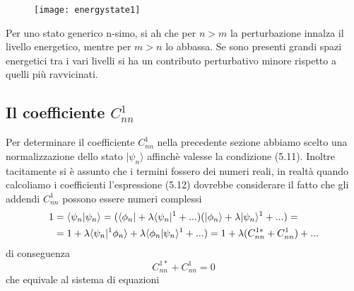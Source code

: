 \begin{wrapfigure}{l}{0.4\textwidth} %
    \centering
    \texttt{[image: energystate1]} %
    \label{fig:example}
\end{wrapfigure}
Per uno stato generico n-simo, si ah che per $n > m$ la perturbazione innalza il livello energetico, mentre per $m > n$ lo abbassa. Se sono presenti grandi spazi energetici tra i vari livelli si ha un contributo perturbativo minore rispetto a quelli pi\`u ravvicinati.

\subsection{Il coefficiente $C_{nn}^1$}

Per determinare il coefficiente $C^{1}_{nn}$ nella precedente sezione abbiamo scelto una normalizzazione dello stato $|\psi_n \rangle$ affinch\`e valesse la condizione (5.11). Inoltre tacitamente si \`e assunto che i termini fossero dei numeri reali, in realt\`a quando calcoliamo i coefficienti l'espressione (5.12) dovrebbe considerare il fatto che gli addendi $C_{nn}^{1}$ possono essere numeri complessi
\begin{align}
	1 & = \langle \psi_n| \psi_n \rangle = (\langle \phi_n| + \lambda \langle \psi_n|^1 +...)(|\phi_n \rangle + \lambda |\psi_n \rangle^1 +...) = \notag \\& = 1 +\lambda \langle \psi_n|^1\phi_n \rangle + \lambda \langle \phi_n|\psi_n \rangle^1 +... )=1 + \lambda(C^{1*}_{nn} + C_{nn}^1)+...
\end{align} 
 di conseguenza
 \begin{equation}
  C_{nn}^{1*} + C_{nn}^1 = 0
 \end{equation}
che equivale al sistema di equazioni

